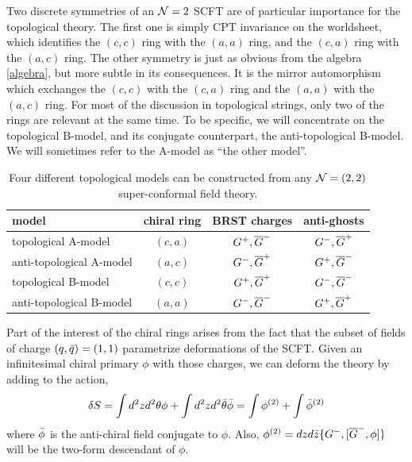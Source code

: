Two discrete symmetries of an ${\cal N}=2$ SCFT are of particular importance
for the topological theory. The first one is simply CPT invariance on the
worldsheet, which identifies the $(c,c)$ ring with the $(a,a)$ ring, and
the $(c,a)$ ring with the $(a,c)$ ring. The other symmetry is just as
obvious from the algebra \eqref{algebra}, but more subtle in its consequences. 
It is the mirror automorphism which exchanges the $(c,c)$ with the $(c,a)$
ring and the $(a,a)$ with the $(a,c)$ ring. For most of the discussion in
topological strings, only two of the rings are relevant at the same time. 
To be specific, we will concentrate on the topological B-model, and its 
conjugate counterpart, the anti-topological B-model. We will sometimes
refer to the A-model as ``the other model''.

\begin{table}[ht]
\begin{center}
\begin{tabular}{|l|c|c|c|}
\hline
model & chiral ring &  BRST charges & anti-ghosts \\\hline
topological A-model & $(c,a)$ & $G^+ , {\overline G}^-$ & $G^-, {\overline G}^+$ \\
anti-topological A-model & $(a,c)$ & $G^-, {\overline G}^+$ & $G^+ , {\overline G}^-$ \\
topological B-model & $(c,c)$  & $G^+ , {\overline G}^+$ & $G^- , {\overline G}^-$ \\
anti-topological B-model & $(a,a)$ & $G^- , {\overline G}^-$ & $G^+ , {\overline G}^+$ 
\\\hline
\end{tabular}
\end{center}
\caption{Four different topological models can be constructed from
any ${\cal N}=(2,2)$ super-conformal field theory.}
\label{four}
\end{table}

Part of the interest of the chiral rings arises from the fact that the
subset of fields of charge $(q,{\bar q})=(1,1)$ parametrize deformations of the
SCFT. Given an infinitesimal chiral primary $\phi$ with those charges, we 
can deform the theory by adding to the action,
\begin{equation}
\eqlabel{deform}
\delta S = \int d^2zd^2\theta\phi + \int d^2zd^2\bar\theta\phib
= \int \phi^{(2)} + \int \phib^{(2)}
\end{equation}
where ${\bar \phi}$ is the anti-chiral field conjugate to $\phi$.
Also, $\phi^{(2)} = dzd{\bar z}\{G^-,[{\overline G}^-,\phi]\}$ will be the two-form 
descendant of $\phi$.

